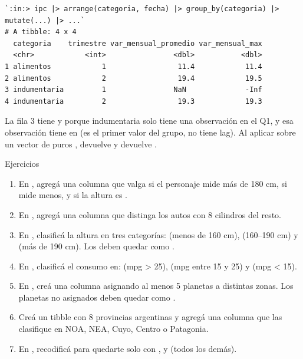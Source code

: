 \documentclass[8pt]{beamer}
\begin{document}
	\begin{frame}[fragile]
\begin{lstlisting}[style=RConsole]
`:in:> ipc |> arrange(categoria, fecha) |> group_by(categoria) |> mutate(...) |> ...`
# A tibble: 4 x 4
  categoria    trimestre var_mensual_promedio var_mensual_max
  <chr>            <int>                <dbl>           <dbl>
1 alimentos            1                 11.4            11.4
2 alimentos            2                 19.4            19.5
3 indumentaria         1                NaN              -Inf
4 indumentaria         2                 19.3            19.3
\end{lstlisting}

		\begin{alertblock}{}
			La fila 3 tiene  y  porque indumentaria solo tiene una observación en el Q1, y esa observación tiene  en  (es el primer valor del grupo, no tiene lag). Al aplicar  sobre un vector de puros ,  devuelve  y  devuelve .
		\end{alertblock}
	\end{frame}


	\begin{frame}[fragile]{Ejercicios}
		\begin{enumerate}
			\item En , agregá una columna  que valga  si el personaje mide más de 180 cm,  si mide menos, y  si la altura es .

			\item En , agregá una columna  que distinga los autos con 8 cilindros del resto.

			\item En , clasificá la altura en tres categorías:  (menos de 160 cm),  (160--190 cm) y  (más de 190 cm). Los  deben quedar como .

			\item En , clasificá el consumo en:  (mpg > 25),  (mpg entre 15 y 25) y  (mpg < 15).

			\item En , creá una columna  asignando al menos 5 planetas a distintas zonas. Los planetas no asignados deben quedar como .

			\item Creá un tibble con 8 provincias argentinas y agregá una columna  que las clasifique en NOA, NEA, Cuyo, Centro o Patagonia.

			\item En , recodificá  para quedarte solo con ,  y  (todos los demás).
		\end{enumerate}
	\end{frame}
\end{document}
